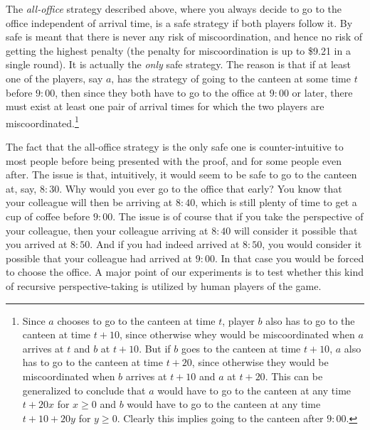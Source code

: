 \documentclass[twocolumn,a4paper,superscriptaddress,nofootinbib]{revtex4}
\begin{document}
The \emph{all-office} strategy described above, where you always decide to go to the office independent of arrival time, is a safe strategy if both players follow it. By safe is meant that there is never any risk of miscoordination, and hence no risk of getting the highest penalty (the penalty for miscoordination is up to \$9.21 in a single round). It is actually the \emph{only} safe strategy. The reason is that if at least one of the players, say $a$, has the strategy of going to the canteen at some time $t$ before $9{:}00$, then since they both have to go to the office at $9{:}00$ or later, there must exist at least one pair of arrival times for which the two players are miscoordinated.\footnote{Since $a$ chooses to go to the canteen at time $t$, player $b$ also has to go to the canteen at time $t+10$, since otherwise whey would be miscoordinated when $a$ arrives at $t$ and $b$ at $t+10$. But if $b$ goes to the canteen at time $t+10$, $a$ also has to go to the canteen at time $t+20$, since otherwise they would be miscoordinated when $b$ arrives at $t+10$ and $a$ at $t+20$. This can be generalized to conclude  that $a$ would have to go to the canteen at any time $t+20x$ for $x \geq 0$ and $b$ would have to go to the canteen at any time $t+10+20y$ for $y \geq 0$. Clearly this implies going to the canteen after $9{:}00$.}

The fact that the all-office strategy is the only safe one is counter-intuitive to most people before being presented with the proof, and for some people even after. The issue is that, intuitively, it would seem to be safe to go to the canteen at, say, $8{:}30$. Why would you ever go to the office that early? You know that your colleague will then be arriving at $8{:}40$, which is still plenty of time to get a cup of coffee before $9{:}00$. The issue is of course that if you take the perspective of your colleague, then your colleague arriving at $8{:}40$ will consider it possible that you arrived at $8{:}50$. And if you had indeed arrived at $8{:}50$, you would consider it possible that your colleague had arrived at $9{:}00$. In that case you would be forced to choose the office. A major point of our experiments is to test whether this kind of recursive perspective-taking is utilized by human players of the game.
\end{document}
